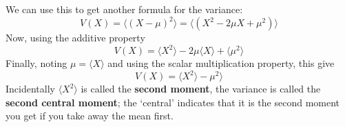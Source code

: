 \documentclass[11pt,a4paper]{scrartcl}
\begin{document}
We can use this to get another formula for the variance:
\begin{equation}
V(X)=\langle (X-\mu)^2\rangle=\langle (X^2-2\mu X+\mu^2)\rangle
\end{equation}
Now, using the additive property
\begin{equation}
V(X)=\langle X^2 \rangle -2\mu\langle X\rangle +\langle \mu^2 \rangle
\end{equation}
Finally, noting $\mu=\langle X\rangle$ and using the scalar multiplication property, this give
\begin{equation}
V(X)=\langle X^2 \rangle - \mu^2 \rangle
\end{equation}
Incidentally $\langle X^2\rangle$ is called the \textbf{second
  moment}, the variance is called the \textbf{second central moment};
the \lq{}central\rq{} indicates that it is the second moment you get
if you take away the mean first.

\newpage

\end{document}
